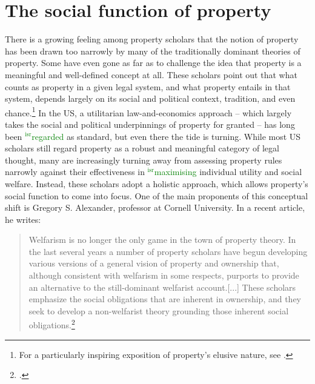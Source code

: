 \documentclass[12pt,a4paper]{book} %
\newcommand{\isr}[1]{\textcolor{green}{$^{\textrm{isr}}${#1}}}
\begin{document}
\section{The social function of property}

There is a growing feeling among property scholars that the notion of property has been drawn too narrowly by many of the traditionally dominant theories of property. Some have even gone as far as to challenge the idea that property is a meaningful and well-defined concept at all. These scholars point out that what counts as property in a given legal system, and what property entails in that system, depends largely on its social and political context, tradition, and even chance.\footnote{For a particularly inspiring exposition of property's elusive nature, see \cite{gray91}.} In the US, a utilitarian law-and-economics approach -- which largely takes the social and political underpinnings of property for granted -- has long been \isr{regarded} as standard, but even there the tide is turning. While most US scholars still regard property as a robust and meaningful category of legal thought, many are increasingly turning away from assessing property rules narrowly against their effectiveness in \isr{maximising} individual utility and social welfare. Instead, these scholars adopt a holistic approach, which allows property's social function to come into focus. One of the main proponents of this conceptual shift is Gregory S. Alexander, professor at Cornell University. In a recent article, he writes:

\begin{quote} Welfarism is no longer the only game in the town of property theory. In the last several years a number of property scholars have begun developing various versions of a general vision of property and ownership that, although consistent with welfarism in some respects, purports to provide an alternative to the still-dominant welfarist account.[...] These scholars emphasize the social obligations that are inherent in ownership, and they seek to develop a non-welfarist theory grounding those inherent social obligations.\footcite[1017]{alexander11}
\end{quote}
\end{document}
